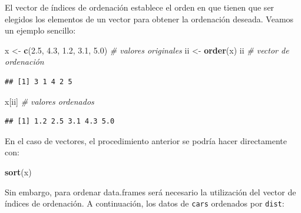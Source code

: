 \documentclass[]{book}
\newenvironment{Shaded}{\begin{snugshade}}{\end{snugshade}}
\newcommand{\KeywordTok}[1]{\textcolor[rgb]{0.13,0.29,0.53}{\textbf{#1}}}
\newcommand{\FloatTok}[1]{\textcolor[rgb]{0.00,0.00,0.81}{#1}}
\newcommand{\StringTok}[1]{\textcolor[rgb]{0.31,0.60,0.02}{#1}}
\newcommand{\CommentTok}[1]{\textcolor[rgb]{0.56,0.35,0.01}{\textit{#1}}}
\newcommand{\OperatorTok}[1]{\textcolor[rgb]{0.81,0.36,0.00}{\textbf{#1}}}
\newcommand{\NormalTok}[1]{#1}
\begin{document}
El vector de índices de ordenación establece el orden en que tienen que
ser elegidos los elementos de un vector para obtener la ordenación
deseada. Veamos un ejemplo sencillo:

\begin{Shaded}
\begin{Highlighting}[]
\NormalTok{x <-}\StringTok{ }\KeywordTok{c}\NormalTok{(}\FloatTok{2.5}\NormalTok{, }\FloatTok{4.3}\NormalTok{, }\FloatTok{1.2}\NormalTok{, }\FloatTok{3.1}\NormalTok{, }\FloatTok{5.0}\NormalTok{) }\CommentTok{# valores originales}
\NormalTok{ii <-}\StringTok{ }\KeywordTok{order}\NormalTok{(x)}
\NormalTok{ii    }\CommentTok{# vector de ordenación}
\end{Highlighting}
\end{Shaded}

\begin{verbatim}
## [1] 3 1 4 2 5
\end{verbatim}

\begin{Shaded}
\begin{Highlighting}[]
\NormalTok{x[ii] }\CommentTok{# valores ordenados}
\end{Highlighting}
\end{Shaded}

\begin{verbatim}
## [1] 1.2 2.5 3.1 4.3 5.0
\end{verbatim}

En el caso de vectores, el procedimiento anterior se podría hacer
directamente con:

\begin{Shaded}
\begin{Highlighting}[]
\KeywordTok{sort}\NormalTok{(x)}
\end{Highlighting}
\end{Shaded}

Sin embargo, para ordenar data.frames será necesario la utilización del
vector de índices de ordenación. A continuación, los datos de
\texttt{cars} ordenados por \texttt{dist}:

\begin{Shaded}
\end{Shaded}
\end{document}
